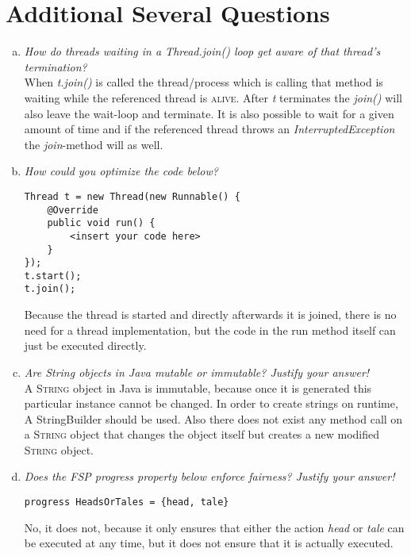 \documentclass{report}
\begin{document}
	\section{Additional Several Questions}
	\startsection
		\begin{enumerate}[a)]
			\item \textit{How do threads waiting in a Thread.join() loop get aware of that thread’s termination?} \\
			When \textit{t.join()} is called the thread/process which is calling that method is waiting while the referenced thread is \textsc{alive}. After \textit{t} terminates the \textit{join()} will also leave the wait-loop and terminate. It is also possible to wait for a given amount of time and if the referenced thread throws an \textit{InterruptedException} the \textit{join}-method will as well.
			\item \textit{How could you optimize the code below?}
			\begin{verbatim}
Thread t = new Thread(new Runnable() {
	@Override
	public void run() {
		<insert your code here>
	}
});
t.start();
t.join();
			\end{verbatim}
			Because the thread is started and directly afterwards it is joined, there is no need for a thread implementation, but the code in the run method itself can just be executed directly.
			\item \textit{Are String objects in Java mutable or immutable? Justify your answer!} \\
			A \textsc{String} object in Java is immutable, because once it is generated this particular instance cannot be changed. In order to create strings on runtime, A StringBuilder should be used. Also there does not exist any method call on a \textsc{String} object that changes the object itself but creates a new modified \textsc{String} object.
			\item \textit{Does the FSP progress property below enforce fairness? Justify your answer!}
			\begin{verbatim}
progress HeadsOrTales = {head, tale}
			\end{verbatim}
			No, it does not, because it only ensures that either the action \textit{head} or \textit{tale} can be executed at any time, but it does not ensure that it is actually executed.
		\end{enumerate}
	\closesection
\end{document}

